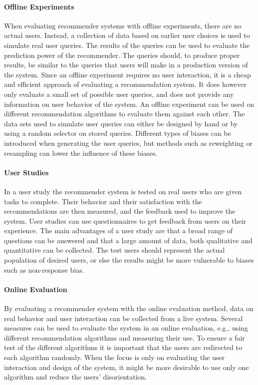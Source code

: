 \paragraph{Offline Experiments} When evaluating recommender systems with offline experiments, there are no actual users. Instead, a collection of data based on earlier user choices is used to simulate real user queries. The results of the queries can be used to evaluate the prediction power of the recommender. The queries should, to produce proper results, be similar to the queries that users will make in a production version of the system. Since an offline experiment requires no user interaction, it is a cheap and efficient approach of evaluating a recommendation system. It does however only evaluate a small set of possible user queries, and does not provide any information on user behavior of the system.  An offline experiment can be used on different recommendation algorithms to evaluate them against each other. The data sets used to simulate user queries can either be designed by hand or by using a random selector on stored queries. Different types of biases can be introduced when generating the user queries, but methods such as reweighting or resampling can lower the influence of these biases. 

\paragraph{User Studies} In a user study the recommender system is tested on real users who are given tasks to complete. Their behavior and their satisfaction with the recommendations are then measured, and the feedback used to improve the system. User studies can use questionnaires to get feedback from users on their experience. The main advantages of a user study are that a broad range of questions can be answered and that a large amount of data, both qualitative and quantitative can be collected. The test users should represent the actual population of desired users, or else the results might be more vulnerable to biases such as non-response bias.

\paragraph{Online Evaluation} By evaluating a recommender system with the online evaluation method, data on real behavior and user interaction can be collected from a live system. Several measures can be used to evaluate the system in an online evaluation, e.g., using different recommendation algorithms and measuring their use. To ensure a fair test of the different algorithms it is important that the users are redirected to each algorithm randomly. When the focus is only on evaluating the user interaction and design of the system, it might be more desirable to use only one algorithm and reduce the users' disorientation. 

\cleardoublepage